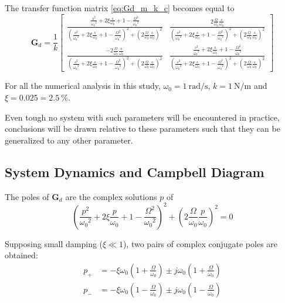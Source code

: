 \documentclass{ISMA_USD2020}
\begin{document}
The transfer function matrix \eqref{eq:Gd_m_k_c} becomes equal to
\begin{equation}
\label{eq:Gd_w0_xi_k}
\bm{G}_{d} =
  \frac{1}{k}
  \begin{bmatrix}
    \frac{\frac{s^2}{{\omega_0}^2} + 2 \xi \frac{s}{\omega_0} + 1 - \frac{{\Omega}^2}{{\omega_0}^2}}{\left( \frac{s^2}{{\omega_0}^2} + 2 \xi \frac{s}{\omega_0} + 1 - \frac{{\Omega}^2}{{\omega_0}^2} \right)^2 + \left( 2 \frac{\Omega}{\omega_0} \frac{s}{\omega_0} \right)^2} & \frac{2 \frac{\Omega}{\omega_0} \frac{s}{\omega_0}}{\left( \frac{s^2}{{\omega_0}^2} + 2 \xi \frac{s}{\omega_0} + 1 - \frac{{\Omega}^2}{{\omega_0}^2} \right)^2 + \left( 2 \frac{\Omega}{\omega_0} \frac{s}{\omega_0} \right)^2} \\
    \frac{- 2 \frac{\Omega}{\omega_0} \frac{s}{\omega_0}}{\left( \frac{s^2}{{\omega_0}^2} + 2 \xi \frac{s}{\omega_0} + 1 - \frac{{\Omega}^2}{{\omega_0}^2} \right)^2 + \left( 2 \frac{\Omega}{\omega_0} \frac{s}{\omega_0} \right)^2} & \frac{\frac{s^2}{{\omega_0}^2} + 2 \xi \frac{s}{\omega_0} + 1 - \frac{{\Omega}^2}{{\omega_0}^2}}{\left( \frac{s^2}{{\omega_0}^2} + 2 \xi \frac{s}{\omega_0} + 1 - \frac{{\Omega}^2}{{\omega_0}^2} \right)^2 + \left( 2 \frac{\Omega}{\omega_0} \frac{s}{\omega_0} \right)^2}
  \end{bmatrix}
\end{equation}

For all the numerical analysis in this study, \(\omega_0 = \SI{1}{\radian\per\second}\), \(k = \SI{1}{\newton\per\meter}\) and \(\xi = 0.025 = \SI{2.5}{\percent}\).

Even tough no system with such parameters will be encountered in practice, conclusions will be drawn relative to these parameters such that they can be generalized to any other parameter.

\subsection{System Dynamics and Campbell Diagram}
\label{sec:org0ed334c}
The poles of \(\bm{G}_d\) are the complex solutions \(p\) of
\begin{equation}
  \left( \frac{p^2}{{\omega_0}^2} + 2 \xi \frac{p}{\omega_0} + 1 - \frac{{\Omega}^2}{{\omega_0}^2} \right)^2 + \left( 2 \frac{\Omega}{\omega_0} \frac{p}{\omega_0} \right)^2 = 0
\end{equation}

Supposing small damping (\(\xi \ll 1\)), two pairs of complex conjugate poles are obtained:
\begin{subequations}
\label{eq:pole_values}
  \begin{align}
    p_{+} &= - \xi \omega_0 \left( 1 + \frac{\Omega}{\omega_0} \right) \pm j \omega_0 \left( 1 + \frac{\Omega}{\omega_0} \right) \\
    p_{-} &= - \xi \omega_0 \left( 1 - \frac{\Omega}{\omega_0} \right) \pm j \omega_0 \left( 1 - \frac{\Omega}{\omega_0} \right)
  \end{align}
\end{subequations}
\end{document}
